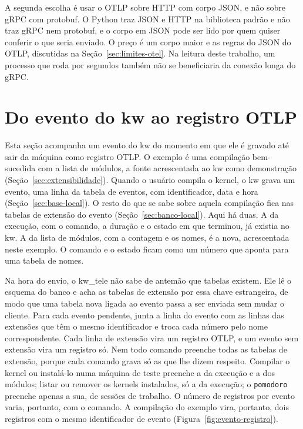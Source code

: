 A segunda escolha é usar o OTLP sobre HTTP com corpo JSON, e não sobre gRPC
com protobuf. O Python traz JSON e HTTP na biblioteca padrão e não traz gRPC
nem protobuf, e o corpo em JSON pode ser lido por quem quiser conferir o que
seria enviado. O preço é um corpo maior e as regras do JSON do OTLP,
discutidas na Seção~\ref{sec:limites-otel}. Na leitura deste trabalho, um
processo que roda por segundos também não se beneficiaria da conexão longa do
gRPC.

\section{Do evento do kw ao registro OTLP}
\label{sec:mapeamento}

Esta seção acompanha um evento do kw do momento em que ele é gravado até sair
da máquina como registro OTLP. O exemplo é uma compilação bem-sucedida com a
lista de módulos, a fonte acrescentada ao kw como demonstração
(Seção~\ref{sec:extensibilidade}). Quando o usuário compila o kernel, o kw grava
um evento, uma linha da tabela de eventos, com identificador, data e hora
(Seção~\ref{sec:base-local}). O resto do que se sabe sobre aquela compilação fica nas tabelas de extensão
do evento (Seção~\ref{sec:banco-local}). Aqui há duas. A da execução, com o comando, a duração e o estado em que
terminou, já existia no kw. A da lista de módulos, com a contagem e os nomes,
é a nova, acrescentada neste exemplo. O comando e o estado ficam como um número que aponta para uma tabela de nomes.

Na hora do envio, o kw\_tele não sabe de antemão que tabelas existem. Ele lê o
esquema do banco e acha as tabelas de extensão por essa chave estrangeira, de
modo que uma tabela nova ligada ao evento passa a ser enviada sem mudar o
cliente. Para cada evento pendente, junta a linha do evento com as linhas das
extensões que têm o mesmo identificador e troca cada número pelo nome
correspondente. Cada linha de extensão vira um registro OTLP, e um evento sem
extensão vira um registro só. Nem todo comando preenche todas as tabelas de
extensão, porque cada comando grava só as que lhe dizem respeito. Compilar o kernel ou
instalá-lo numa máquina de teste preenche a da execução e a dos módulos; listar
ou remover os kernels instalados, só a da execução; o \texttt{pomodoro}
preenche apenas a sua, de sessões de trabalho. O número de registros por evento
varia, portanto, com o comando. A compilação do exemplo vira, portanto, dois
registros com o mesmo identificador de evento
(Figura~\ref{fig:evento-registro}).

